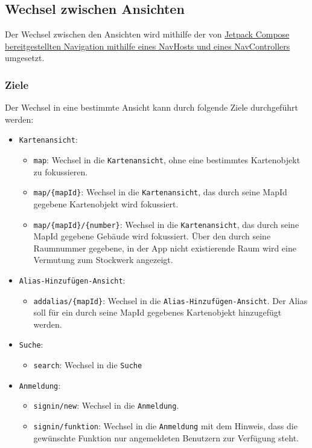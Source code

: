 \subsection{Wechsel zwischen Ansichten}
Der Wechsel zwischen den Ansichten wird mithilfe der von \href{https://developer.android.com/jetpack/compose/navigation?hl=fr}
{Jetpack Compose bereitgestellten Navigation mithilfe eines NavHosts und eines NavControllers} 
umgesetzt.

\subsubsection*{Ziele}
Der Wechsel in eine bestimmte Ansicht kann durch folgende Ziele durchgeführt werden:
\begin{itemize}
    \item \texttt{Kartenansicht}: 
    \begin{itemize}
        \item \texttt{map}: Wechsel in die \texttt{Kartenansicht}, ohne eine bestimmtes Kartenobjekt zu fokussieren.
        \item \texttt{map/\{mapId\}}: Wechsel in die \texttt{Kartenansicht}, das durch seine MapId gegebene Kartenobjekt wird fokussiert.
        \item \texttt{map/\{mapId\}/\{number\}}: Wechsel in die \texttt{Kartenansicht}, das durch seine MapId gegebene Gebäude wird fokussiert. 
        Über den durch seine Raumnummer gegebene, in der App nicht existierende Raum wird eine Vermutung zum Stockwerk angezeigt.
    \end{itemize}
    \item \texttt{Alias-Hinzufügen-Ansicht}:
    \begin{itemize}
        \item \texttt{addalias/\{mapId\}}: Wechsel in die \texttt{Alias-Hinzufügen-Ansicht}. 
        Der Alias soll für ein durch seine MapId gegebenes Kartenobjekt hinzugefügt werden.
    \end{itemize}
    \item \texttt{Suche}: 
    \begin{itemize}
        \item \texttt{search}: Wechsel in die \texttt{Suche}
    \end{itemize}
    \item \texttt{Anmeldung}: \begin{itemize}
        \item \texttt{signin/new}: Wechsel in die \texttt{Anmeldung}.
        \item \texttt{signin/funktion}: Wechsel in die \texttt{Anmeldung} mit dem Hinweis, dass die gewünschte Funktion nur angemeldeten Benutzern zur Verfügung steht.

\end{itemize}
\end{itemize}
